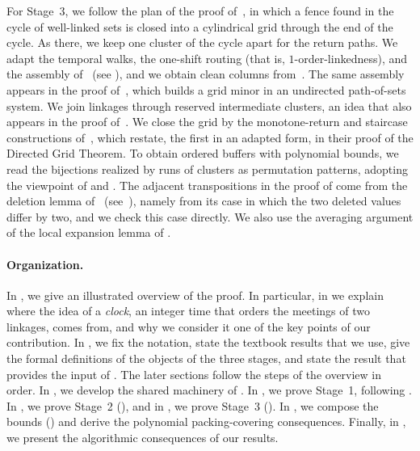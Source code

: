 \documentclass[fontsize=12pt,leading=14pt]{fullpaper}
\newcounter{step}
\begin{document}
For Stage~3, we follow the plan of the proof of~\cite[Theorem~3.18]{HKMM26b}, in which a fence found in the cycle of well-linked sets is closed into a cylindrical grid through the end of the cycle.
As there, we keep one cluster of the cycle apart for the return paths.
We adapt the temporal walks, the one-shift routing (that is, $1$-order-linkedness), and the assembly of~\cite[sections~6 and~7]{HKMM26a} (see ), and we obtain clean columns from~\cite[(4.6)]{ReedRST96}.
The same assembly appears in the proof of~\cite[Corollary~3.3]{CC16}, which builds a grid minor in an undirected path-of-sets system.
We join linkages through reserved intermediate clusters, an idea that also appears in the proof of~\cite[Corollary~3.2]{CC16}.
We close the grid by the monotone-return and staircase constructions of~\cite[(3.3) and~(4.7)]{ReedRST96}, which \textcite[lemmas~6.3 and~5.5]{KawarabayashiK15} restate, the first in an adapted form, in their proof of the Directed Grid Theorem.
To obtain ordered buffers with polynomial bounds, we read the bijections realized by runs of clusters as permutation patterns, adopting the viewpoint of \textcite{AtkinsonBeals01} and \textcite{Lehtonen20}.
The adjacent transpositions in the proof of  come from the deletion lemma of~\cite[Lemma~1]{AtkinsonBeals01} (see~\cite[Lemma~4.2]{Lehtonen20}), namely from its case in which the two deleted values differ by two, and we check this case directly.
We also use the averaging argument of the local expansion lemma of \textcite{Babai91}.

\paragraph{Organization.}
In , we give an illustrated overview of the proof.
In particular, in  we explain where the idea of a \emph{clock}, an integer time that orders the meetings of two linkages, comes from, and why we consider it one of the key points of our contribution.
In , we fix the notation, state the textbook results that we use, give the formal definitions of the objects of the three stages, and state the result that provides the input of .
The later sections follow the steps of the overview in order.
In , we develop the shared machinery of .
In , we prove Stage~1, following .
In , we prove Stage~2 (), and in , we prove Stage~3 ().
In , we compose the bounds () and derive the polynomial packing-covering consequences.
Finally, in , we present the algorithmic consequences of our results.
\end{document}
